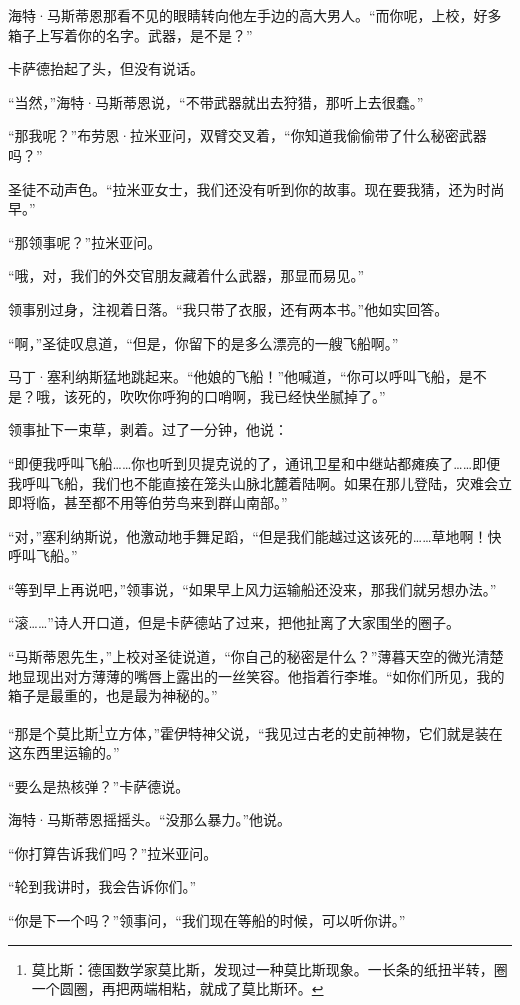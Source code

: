 \documentclass[AutoFakeBold=true]{book}
\begin{document}
海特·马斯蒂恩那看不见的眼睛转向他左手边的高大男人。``而你呢，上校，好多箱子上写着你的名字。武器，是不是？''

卡萨德抬起了头，但没有说话。

``当然，''海特·马斯蒂恩说，``不带武器就出去狩猎，那听上去很蠢。''

``那我呢？''布劳恩·拉米亚问，双臂交叉着，``你知道我偷偷带了什么秘密武器吗？''

圣徒不动声色。``拉米亚女士，我们还没有听到你的故事。现在要我猜，还为时尚早。''

``那领事呢？''拉米亚问。

``哦，对，我们的外交官朋友藏着什么武器，那显而易见。''

领事别过身，注视着日落。``我只带了衣服，还有两本书。''他如实回答。

``啊，''圣徒叹息道，``但是，你留下的是多么漂亮的一艘飞船啊。''

马丁·塞利纳斯猛地跳起来。``他娘的飞船！''他喊道，``你可以呼叫飞船，是不是？哦，该死的，吹吹你呼狗的口哨啊，我已经快坐腻掉了。''

领事扯下一束草，剥着。过了一分钟，他说：

``即便我呼叫飞船……你也听到贝提克说的了，通讯卫星和中继站都瘫痪了……即便我呼叫飞船，我们也不能直接在笼头山脉北麓着陆啊。如果在那儿登陆，灾难会立即将临，甚至都不用等伯劳鸟来到群山南部。''

``对，''塞利纳斯说，他激动地手舞足蹈，``但是我们能越过这该死的……草地啊！快呼叫飞船。''

``等到早上再说吧，''领事说，``如果早上风力运输船还没来，那我们就另想办法。''

``滚……''诗人开口道，但是卡萨德站了过来，把他扯离了大家围坐的圈子。

``马斯蒂恩先生，''上校对圣徒说道，``你自己的秘密是什么？''薄暮天空的微光清楚地显现出对方薄薄的嘴唇上露出的一丝笑容。他指着行李堆。``如你们所见，我的箱子是最重的，也是最为神秘的。''

``那是个莫比斯\footnote{莫比斯：德国数学家莫比斯，发现过一种莫比斯现象。一长条的纸扭半转，圈一个圆圈，再把两端相粘，就成了莫比斯环。}立方体，''霍伊特神父说，``我见过古老的史前神物，它们就是装在这东西里运输的。''

``要么是热核弹？''卡萨德说。

海特·马斯蒂恩摇摇头。``没那么暴力。''他说。

``你打算告诉我们吗？''拉米亚问。

``轮到我讲时，我会告诉你们。''

``你是下一个吗？''领事问，``我们现在等船的时候，可以听你讲。''
\end{document}
